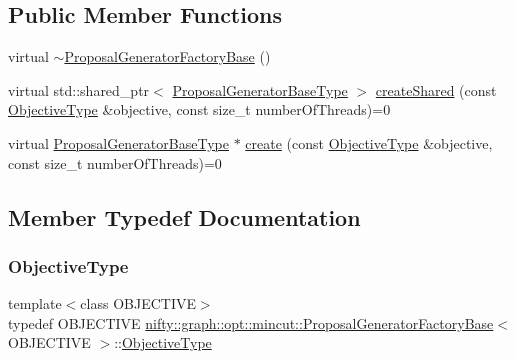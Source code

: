 \subsection*{Public Member Functions}
\begin{DoxyCompactItemize}
\item 
virtual \hyperlink{classnifty_1_1graph_1_1opt_1_1mincut_1_1ProposalGeneratorFactoryBase_a06c0dcfbe9a212a0581845a2faa8340b}{$\sim$\+Proposal\+Generator\+Factory\+Base} ()
\item 
virtual std\+::shared\+\_\+ptr$<$ \hyperlink{classnifty_1_1graph_1_1opt_1_1mincut_1_1ProposalGeneratorFactoryBase_a6c03cbefa18b1f47e337d700d774cd97}{Proposal\+Generator\+Base\+Type} $>$ \hyperlink{classnifty_1_1graph_1_1opt_1_1mincut_1_1ProposalGeneratorFactoryBase_ae5a36d5232e166ce2eb3ddf11fd63197}{create\+Shared} (const \hyperlink{classnifty_1_1graph_1_1opt_1_1mincut_1_1ProposalGeneratorFactoryBase_a51fcc2cc6c0db5a4d48609e0f9716f1b}{Objective\+Type} \&objective, const size\+\_\+t number\+Of\+Threads)=0
\item 
virtual \hyperlink{classnifty_1_1graph_1_1opt_1_1mincut_1_1ProposalGeneratorFactoryBase_a6c03cbefa18b1f47e337d700d774cd97}{Proposal\+Generator\+Base\+Type} $\ast$ \hyperlink{classnifty_1_1graph_1_1opt_1_1mincut_1_1ProposalGeneratorFactoryBase_a29fe8a5d3418f0413785f52c8819bd2f}{create} (const \hyperlink{classnifty_1_1graph_1_1opt_1_1mincut_1_1ProposalGeneratorFactoryBase_a51fcc2cc6c0db5a4d48609e0f9716f1b}{Objective\+Type} \&objective, const size\+\_\+t number\+Of\+Threads)=0
\end{DoxyCompactItemize}


\subsection{Member Typedef Documentation}
\mbox{\label{classnifty_1_1graph_1_1opt_1_1mincut_1_1ProposalGeneratorFactoryBase_a51fcc2cc6c0db5a4d48609e0f9716f1b}} 
\subsubsection{\texorpdfstring{Objective\+Type}{ObjectiveType}}
{\footnotesize\ttfamily template$<$class O\+B\+J\+E\+C\+T\+I\+VE$>$ \\
typedef O\+B\+J\+E\+C\+T\+I\+VE \hyperlink{classnifty_1_1graph_1_1opt_1_1mincut_1_1ProposalGeneratorFactoryBase}{nifty\+::graph\+::opt\+::mincut\+::\+Proposal\+Generator\+Factory\+Base}$<$ O\+B\+J\+E\+C\+T\+I\+VE $>$\+::\hyperlink{classnifty_1_1graph_1_1opt_1_1mincut_1_1ProposalGeneratorFactoryBase_a51fcc2cc6c0db5a4d48609e0f9716f1b}{Objective\+Type}}


